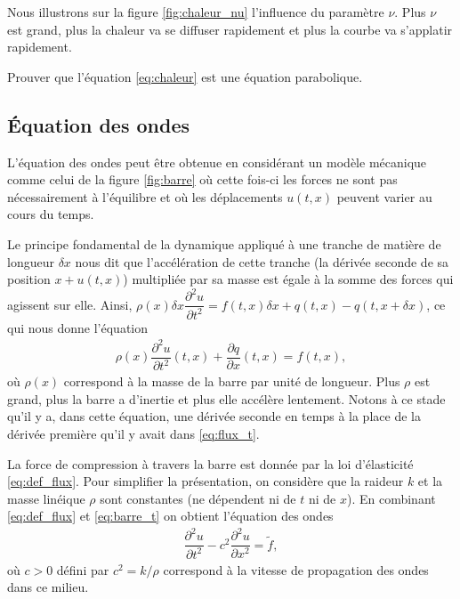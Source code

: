 \documentclass[12pt,a4paper,twoside]{article}
\begin{document}
Nous illustrons sur la figure \ref{fig:chaleur_nu} l'influence du param\`etre $\nu$.
Plus $\nu$ est grand, plus la chaleur va se diffuser rapidement et plus 
la courbe va s'applatir rapidement.

\begin{exercise}
  Prouver que l'\'equation \eqref{eq:chaleur} est une \'equation parabolique.
\end{exercise}


\subsection{\'Equation des ondes}

L'\'equation des ondes peut \^etre obtenue en consid\'erant un mod\`ele m\'ecanique
comme celui de la figure \ref{fig:barre} o\`u cette fois-ci les forces ne
sont pas n\'ecessairement \`a l'\'equilibre et o\`u les d\'eplacements
$u(t,x)$ peuvent varier au cours du temps.

Le principe fondamental de la dynamique appliqu\'e \`a une tranche de mati\`ere
de longueur $\delta x$ nous dit que l'acc\'el\'eration de cette tranche (la d\'eriv\'ee seconde de sa position
$x+u(t,x)$) multipli\'ee par sa masse est \'egale \`a la somme des forces qui
agissent sur elle.
Ainsi, $\rho(x) \delta x \dfrac{\partial^2 u}{\partial t^2} = 
f(t,x) \delta x + q(t,x) - q(t, x + \delta x)$, ce qui nous donne l'\'equation
\begin{align}
  \label{eq:barre_t}
  \rho(x) \dfrac{\partial^2 u}{\partial t^2}(t,x) + \dfrac{\partial q}{\partial x}(t,x) = f(t,x) ,
\end{align}
o\`u $\rho(x)$ correspond \`a la masse de la barre par unit\'e de longueur.
Plus $\rho$ est grand, plus la barre a d'inertie et plus elle acc\'el\`ere lentement.
Notons \`a ce stade qu'il y a, dans cette \'equation, une d\'eriv\'ee seconde en temps
\`a la place de la d\'eriv\'ee premi\`ere qu'il y avait dans \eqref{eq:flux_t}.

La force de compression \`a travers la barre est donn\'ee par la loi d'\'elasticit\'e
\eqref{eq:def_flux}.
Pour simplifier la pr\'esentation, on consid\`ere que la raideur $k$ et la masse
lin\'eique $\rho$ sont constantes (ne d\'ependent ni de $t$ ni de $x$).
En combinant \eqref{eq:def_flux} et \eqref{eq:barre_t} on obtient l'\'equation des ondes
\begin{align}
  \label{eq:ondes}
  \dfrac{\partial^2 u}{\partial t^2} - c^2 \dfrac{\partial^2 u}{\partial x^2} = \widetilde{f} ,
\end{align}
o\`u $c>0$ d\'efini par $c^2 = k/\rho$ correspond \`a la vitesse de propagation
des ondes dans ce milieu.
\end{document}
